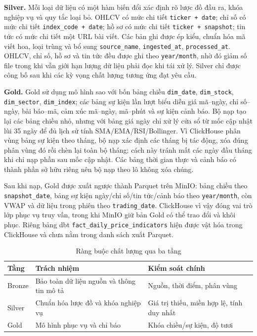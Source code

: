 \documentclass[conference,a4paper]{IEEEtran}
\newcommand{\code}[1]{\texttt{#1}}
\begin{document}
\textbf{Silver.} Mỗi loại dữ liệu có một hàm biến đổi xác định rõ lược đồ đầu ra, khóa nghiệp vụ và quy tắc loại bỏ. OHLCV có mức chi tiết \code{ticker + date}; chỉ số có mức chi tiết \code{index\_code + date}; hồ sơ có mức chi tiết \code{ticker + snapshot}; tin tức có mức chi tiết một URL bài viết. Các bản ghi được ép kiểu, chuẩn hóa mã viết hoa, loại trùng và bổ sung \code{source\_name}, \code{ingested\_at}, \code{processed\_at}. OHLCV, chỉ số, hồ sơ và tin tức đều được ghi theo \code{year/month}, nhờ đó giảm số file trong khi vẫn giới hạn lượng dữ liệu phải đọc khi tái xử lý. Silver chỉ được công bố sau khi các kỳ vọng chất lượng tương ứng đạt yêu cầu.

\textbf{Gold.} Gold sử dụng mô hình sao với bốn bảng chiều \code{dim\_date}, \code{dim\_stock}, \code{dim\_sector}, \code{dim\_index}; các bảng sự kiện lần lượt biểu diễn giá mã--ngày, chỉ số--ngày, bài báo--mã, cảm xúc mã--ngày, mã--phút và sự kiện cảnh báo. Bộ nạp tạo lại các bảng chiều nhỏ, nhưng với bảng giá ngày chỉ xử lý cửa sổ từ mốc cập nhật lùi 35 ngày để đủ lịch sử tính SMA/EMA/RSI/Bollinger. Vì ClickHouse phân vùng bảng sự kiện theo tháng, bộ nạp xác định các tháng bị tác động, xóa đúng phân vùng đó rồi chèn lại toàn bộ tháng; cách này tránh mất các ngày đầu tháng khi chỉ nạp phần sau mốc cập nhật. Các bảng thời gian thực và cảnh báo có thành phần sở hữu riêng nên bộ nạp theo lô không xóa chúng.

Sau khi nạp, Gold được xuất ngược thành Parquet trên MinIO: bảng chiều theo \code{snapshot\_date}, bảng sự kiện ngày/chỉ số/tin tức/cảnh báo theo \code{year/month}, còn VWAP và dữ liệu trong phiên theo \code{trading\_date}. ClickHouse vì vậy đóng vai trò lớp phục vụ truy vấn, trong khi MinIO giữ bản Gold có thể trao đổi và khôi phục. Riêng bảng dbt \code{fact\_daily\_price\_indicators} hiện được vật hóa trong ClickHouse và chưa nằm trong danh sách xuất Parquet.

\begin{table}[t]
\caption{Ràng buộc chất lượng qua ba tầng}
\label{tab:layers}
\centering
\scriptsize
\begin{tabular}{p{1.0cm}p{2.7cm}p{3.3cm}}
\toprule
\textbf{Tầng} & \textbf{Trách nhiệm} & \textbf{Kiểm soát chính} \\
\midrule
Bronze & Bảo toàn dữ liệu nguồn và thông tin mô tả & Nguồn, thời điểm, phân vùng \\
Silver & Chuẩn hóa lược đồ và khóa nghiệp vụ & Giá trị thiếu, miền hợp lệ, tính duy nhất \\
Gold & Mô hình phục vụ và chỉ báo & Khóa chiều/sự kiện, độ tươi \\
\bottomrule
\end{tabular}
\end{table}
\end{document}
